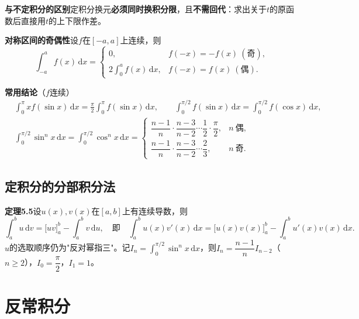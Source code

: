 \noindent\textbf{与不定积分的区别}\quad 定积分换元\textbf{必须同时换积分限}，且\textbf{不需回代}：求出关于$t$的原函数后直接用$t$的上下限作差。

\noindent\textbf{对称区间的奇偶性}\quad 设$f$在$[-a,a]$上连续，则
\[
\int_{-a}^{a}f(x)\,\mathrm{d}x=
\begin{cases}
0, & f(-x)=-f(x)\ (\text{奇}),\\[4pt]
2\displaystyle\int_0^{a}f(x)\,\mathrm{d}x, & f(-x)=f(x)\ (\text{偶}).
\end{cases}
\]

\noindent\textbf{常用结论}（$f$连续）
\begin{align*}
&\int_0^{\pi}xf(\sin x)\,\mathrm{d}x=\frac{\pi}{2}\int_0^{\pi}f(\sin x)\,\mathrm{d}x,\qquad
\int_0^{\pi/2}f(\sin x)\,\mathrm{d}x=\int_0^{\pi/2}f(\cos x)\,\mathrm{d}x,\\
&\int_0^{\pi/2}\sin^nx\,\mathrm{d}x=\int_0^{\pi/2}\cos^nx\,\mathrm{d}x=
\begin{cases}
\dfrac{n-1}{n}\cdot\dfrac{n-3}{n-2}\cdots\dfrac{1}{2}\cdot\dfrac{\pi}{2}, & n\ \text{偶},\\[8pt]
\dfrac{n-1}{n}\cdot\dfrac{n-3}{n-2}\cdots\dfrac{2}{3}, & n\ \text{奇}.
\end{cases}
\end{align*}


\subsection{定积分的分部积分法}

\noindent\textbf{定理5.5}\quad 设$u(x),v(x)$在$[a,b]$上有连续导数，则
\[
\int_a^bu\,\mathrm{d}v=\bigl[uv\bigr]_a^b-\int_a^bv\,\mathrm{d}u ,
\quad\text{即}\quad
\int_a^bu(x)v'(x)\,\mathrm{d}x=\bigl[u(x)v(x)\bigr]_a^b-\int_a^bu'(x)v(x)\,\mathrm{d}x .
\]
$u$的选取顺序仍为"反对幂指三"。记$I_n=\displaystyle\int_0^{\pi/2}\sin^nx\,\mathrm{d}x$，则$I_n=\dfrac{n-1}{n}I_{n-2}$（$n\ge2$），$I_0=\dfrac{\pi}{2}$，$I_1=1$。


\section{反常积分}

